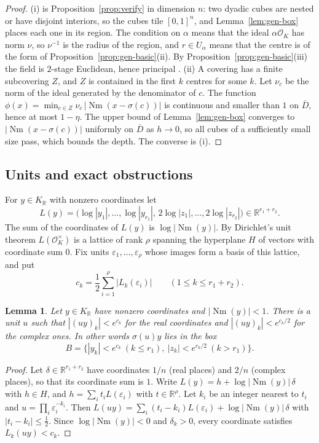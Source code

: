 \documentclass[11pt]{amsart}
\newtheorem{lemma}[theorem]{Lemma}
\theoremstyle{definition}
\theoremstyle{remark}
\numberwithin{equation}{section}
\newcommand{\R}{\mathbb{R}}
\newcommand{\cO}{\mathcal{O}}
\newcommand{\Nm}{\operatorname{Nm}}
\begin{document}
\begin{proof}
(i) is Proposition~\ref{prop:verify} in dimension $n$: two dyadic cubes are nested or have
disjoint interiors, so the cubes tile $[0,1]^n$, and Lemma~\ref{lem:gen-box} places each one in
its region. The condition on $\alpha$ means that the ideal $\alpha\cO_K$ has norm $\nu$, so
$\nu^{-1}$ is the radius of the region, and
$r\in U_\alpha$ means that the centre is of the form of Proposition~\ref{prop:gen-basic}(ii). By
Proposition~\ref{prop:gen-basic}(iii) the field is $2$-stage Euclidean, hence principal
\cite{Co}. (ii) A covering has a finite subcovering $Z$, and $Z$ is contained in the first $k$
centres for some $k$. Let $\nu_c$ be the norm of the ideal generated by the denominator of $c$.
The function $\phi(x)=\min_{c\in Z}\nu_c\,|\Nm(x-\sigma(c))|$ is continuous and smaller than $1$ on
$\overline D$, hence at most $1-\eta$. The upper bound of Lemma~\ref{lem:gen-box} converges to
$|\Nm(x-\sigma(c))|$ uniformly on $\overline D$ as $h\to0$, so all cubes of a sufficiently small
size pass, which bounds the depth. The converse is (i).
\end{proof}

\subsection{Units and exact obstructions}
For $y\in K_\R$ with nonzero coordinates let
\[
  L(y)=\bigl(\log|y_1|,\dots,\log|y_{r_1}|,\,2\log|z_1|,\dots,2\log|z_{r_2}|\bigr)\in\R^{r_1+r_2}.
\]
The sum of the coordinates of $L(y)$ is $\log|\Nm(y)|$. By
Dirichlet's unit theorem $L(\cO_K^\times)$ is a lattice of rank $\rho$ spanning the hyperplane $H$
of vectors with coordinate sum $0$. Fix units $\varepsilon_1,\dots,\varepsilon_\rho$ whose images
form a basis of this lattice, and put
\[
  c_k=\frac12\sum_{i=1}^{\rho}\bigl|L_k(\varepsilon_i)\bigr|\qquad(1\le k\le r_1+r_2).
\]

\begin{lemma}\label{lem:gen-normalize}
Let $y\in K_\R$ have nonzero coordinates and $|\Nm(y)|<1$. There is a unit $u$ such that
$|(uy)_k|<e^{c_k}$ for the real coordinates and $|(uy)_k|<e^{c_k/2}$ for the complex ones. In
other words $\sigma(u)y$ lies in the box
\[
  B=\{|y_k|<e^{c_k}\ (k\le r_1),\ |z_k|<e^{c_k/2}\ (k>r_1)\}.
\]
\end{lemma}

\begin{proof}
Let $\delta\in\R^{r_1+r_2}$ have coordinates $1/n$ (real places) and $2/n$ (complex places), so
that its coordinate sum is $1$. Write $L(y)=h+\log|\Nm(y)|\,\delta$ with $h\in H$, and
$h=\sum_it_iL(\varepsilon_i)$ with $t\in\R^\rho$. Let $k_i$ be an integer nearest to $t_i$ and
$u=\prod_i\varepsilon_i^{-k_i}$. Then
$L(uy)=\sum_i(t_i-k_i)L(\varepsilon_i)+\log|\Nm(y)|\,\delta$ with $|t_i-k_i|\le\frac12$. Since
$\log|\Nm(y)|<0$ and $\delta_k>0$, every coordinate satisfies $L_k(uy)<c_k$.
\end{proof}
\end{document}
